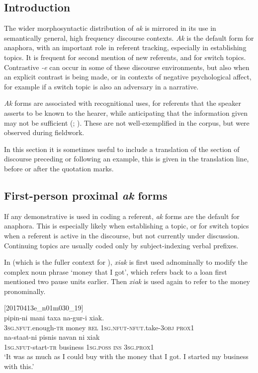 \documentclass[output=paper,colorlinks,citecolor=brown]{langscibook}
\begin{document}
\subsection{Introduction}
\label{sec:ridge:4.1}

The wider morphosyntactic distribution of \textit{ak} is mirrored in its use in semantically general, high frequency discourse contexts. \textit{Ak} is the default form for anaphora, with an important role in referent tracking, especially in establishing topics. It is frequent for second mention of new referents, and for switch topics. Contrastive \textit{-e} can occur in some of these discourse environments, but also when an explicit contrast is being made, or in contexts of negative psychological affect, for example if a switch topic is also an adversary in a narrative.

\textit{Ak} forms are associated with recognitional uses, for referents that the speaker asserts to be known to the hearer, while anticipating that the information given may not be sufficient (\citealt[230]{Himmelmann1996}; \citealt[105-109]{Diessel1999Book}). These are not well-exemplified in the corpus, but were observed during fieldwork.

In this section it is sometimes useful to include a translation of the section of discourse preceding or following an example, this is given in the translation line, before or after the quotation marks.

\subsection{First-person proximal \textit{ak} forms}
\label{sec:ridge:4.2}

If any demonstrative is used in coding a referent, \textit{ak} forms are the default for anaphora. This is especially likely when establishing a topic, or for switch topics when a referent is active in the discourse, but not currently under discussion. Continuing topics are usually coded only by subject-indexing verbal prefixes.

In  (which is the fuller context for ), \textit{xiak} is first used adnominally to modify the complex noun phrase ‘money that I got’, which refers back to a loan first mentioned two pause units earlier. Then \textit{xiak} is used again to refer to the money pronominally.

\ea
{\label{ex:ridge:38}[20170413e\_n01m030\_19]}\\
\gll pipin-ni      mani    taxa        na-gur-i      xiak.\\
     \textsc{3sg.nfut}.enough-\textsc{tr}   money   \textsc{rel}       \textsc{1sg.nfut-nfut}.take-\textsc{3obj}   \textsc{prox1}\\
\gll na-staat-ni    pisnis    navan    ni  xiak\\
     \textsc{1sg.nfut-}start-\textsc{tr}   business  \textsc{1sg.poss}  \textsc{ins}  \textsc{3sg.prox1}\\
\glt ‘It was as much as I could buy with the money that I got. I started my business with this.’
\z
\end{document}
